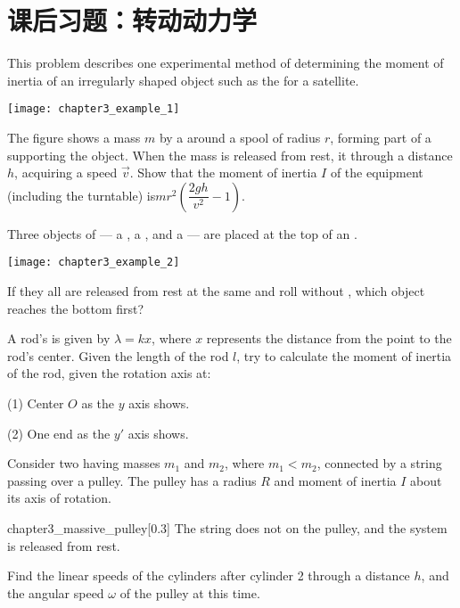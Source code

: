 \newpage
\section{课后习题：转动动力学}
\begin{example}
	This problem describes one experimental method of
	determining the moment of inertia of an irregularly
	shaped object such as the  for a satellite. 
	\begin{center}
		\texttt{[image: chapter3\_example\_1]}
	\end{center}
	
	The figure shows a mass $m$  by a  
	around a spool of radius $r$, forming part of a 
	supporting the object. When the mass is released from
	rest, it  through a distance $h$, acquiring a speed
	$\vec{v}$. Show that the moment of inertia $I$ of the equipment
	(including the turntable) is\quad$mr^2(\dfrac{2gh}{v^2}-1)$. 
\end{example}
\begin{example}
	Three objects of  --- a , a , and a  --- are placed at the top of
	an . 
	\begin{center}
		\texttt{[image: chapter3\_example\_2]}
	\end{center}
	If they all are released from rest
	at the same  and roll without , which object reaches the bottom first?
\end{example}
\begin{example}
	A rod's  is given by $\lambda=kx$, where $x$ represents the distance from the point to the rod's center. 
	Given the length of the rod $l$, try to calculate the moment of inertia of the rod, given the rotation axis at:
	
	(1) Center $O$ as the $y$ axis shows.
	
	(2) One end as the $y'$ axis shows.
\end{example}
\begin{example}
	Consider two  having masses $m_1$
	and $m_2$, where $m_1 < m_2$, connected by a
	string passing over a pulley. The pulley
	has a radius $R$ and moment of inertia $I$
	about its axis of rotation.
	\begin{singlefigure}{chapter3_massive_pulley}[0.3]
		The string does
		not  on the pulley, and the system
		is released from rest. 
	\end{singlefigure}
	 Find the linear
	speeds of the cylinders after
	cylinder 2  through a
	distance $h$, and the angular
	speed $\omega$ of the pulley at this time.
\end{example}
